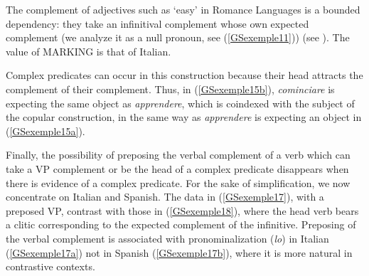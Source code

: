 \documentclass[output=paper
                ,modfonts
                ,nonflat
	        ,collection
	        ,collectionchapter
	        ,collectiontoclongg
 	        ,biblatex
                ,babelshorthands
                ,newtxmath
                ,draftmode
                ,colorlinks, citecolor=brown
]{./langsci/langscibook}
\begin{document}
{\begin{exe}
\begin{xlist}
		\label{GSexemple15b}
		
		  \label{GSexemple15c} 	
	\end{xlist}
\end{exe}

The complement of adjectives such as `easy' in Romance Languages is a bounded dependency: they take an infinitival complement whose own expected complement (we analyze it as a null pronoun, see (\ref{GSexemple11})) (see \citealt{AGS1998, Monachesi98a}). The value of MARKING is that of Italian.

\begin{exe}
\end{exe}

Complex predicates can occur in this construction because their head attracts the complement of their complement. Thus, in (\ref{GSexemple15b}), \textit{cominciare} is expecting the same object as \textit{apprendere}, which is coindexed with the subject of the copular construction, in the same way as \textit{apprendere} is expecting an object in (\ref{GSexemple15a}). 

Finally, the possibility of preposing the verbal complement of a verb which can take a VP complement or be the head of a complex predicate disappears when there is evidence of a complex predicate. For the sake of simplification, we now concentrate on Italian and Spanish. The data in (\ref{GSexemple17}), with a preposed VP, contrast with those in (\ref{GSexemple18}), where the head verb bears a clitic corresponding to the expected complement of the infinitive. Preposing of the verbal complement is associated with pronominalization (\textit{lo}) in Italian (\ref{GSexemple17a}) not in Spanish (\ref{GSexemple17b}), where it is more natural in contrastive contexts.

}
\end{document}
